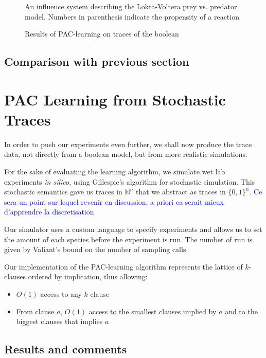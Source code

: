 \documentclass{llncs}
\newcommand{\francois}[1]{\textcolor{blue}{#1}}
\begin{document}
\begin{figure}[htbp]
	
	\vspace{-1em}
	\caption{An influence system describing the Lokta-Voltera prey vs. predator model. Numbers in parenthesis indicate the propensity of a reaction\label{bool-LV}}
\end{figure}
\begin{figure}[htbp]
	
	\vspace{-1em}
	\caption{Results of PAC-learning on traces of the boolean\label{bool-LV.res}}
\end{figure}

\subsection{Comparison with previous section}

\section{PAC Learning from Stochastic Traces}

In order to push our experiments even further, we shall now produce the trace
data, not directly from a boolean model, but from more realistic simulations.

For the sake of evaluating the learning algorithm,
we simulate wet lab experiments \emph{in silico}, using Gillespie's algorithm for stochastic simulation.
This stochastic semantics gave us traces in ${\mathbb{N}}^n$ that we abstract as traces in ${\{0,1\}}^n$.
\francois{Ce sera un point sur lequel revenir en discussion, a priori ca serait mieux d'apprendre la discretisation}

Our simulator uses a custom language to specify experiments and allows us to set the amount of each species before the experiment is run. The number of run is given by Valiant's bound on the number of sampling calls.

Our implementation of the PAC-learning algorithm represents the lattice of $k$-clauses ordered by implication, thus allowing:
\begin{itemize}
	\item $O(1)$ access to any $k$-clause
	\item From clause $a$, $O(1)$ access to the smallest clauses implied by $a$ and to the biggest clauses that implies $a$
\end{itemize}


\subsection{Results and comments}
\end{document}
